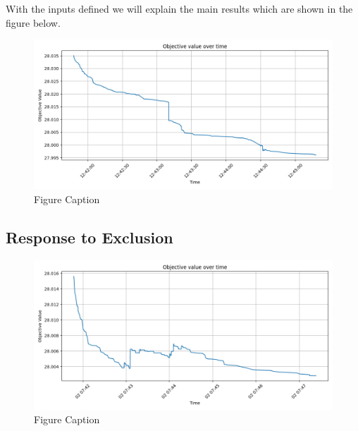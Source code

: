 \documentclass[preprint,12pt,authoryear]{elsarticle}
\begin{document}
With the inputs defined we will explain the main results which are shown in the figure below. 
\begin{figure}[H]%
\centering%
\includegraphics[width=1.0\textwidth]{figures/objective.png}
\caption{Figure Caption}\label{fig:response-to-inclusion}
\end{figure}

\subsection{Response to Exclusion}
\begin{figure}[H]%
\centering%
\includegraphics[width=1.0\textwidth]{figures/objective-400-exclusions.png}
\caption{Figure Caption}\label{fig:objective-exclusion-400}
\end{figure}
\end{document}
